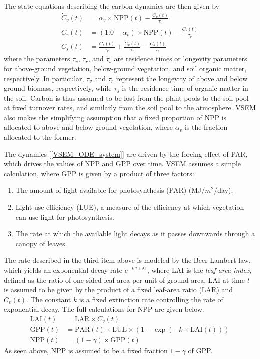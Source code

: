 \documentclass[12pt]{article}
\begin{document}
The state equations describing the carbon dynamics are then given by
\begin{align}
\dot{C}_v(t) &= \alpha_v \times \text{NPP}(t) - \frac{C_v(t)}{\tau_v} \label{VSEM_ODE_system} \\
\dot{C}_r(t) &= (1.0 - \alpha_v) \times \text{NPP}(t) - \frac{C_r(t)}{\tau_r} \nonumber \\
\dot{C}_s(t) &= \frac{C_r(t)}{\tau_r} + \frac{C_v(t)}{\tau_v} - \frac{C_s(t)}{\tau_s} \nonumber 
\end{align}
where the parameters $\tau_v$, $\tau_r$, and $\tau_s$ are residence times or longevity parameters for above-ground vegetation, below-ground vegetation, and soil organic matter, 
respectively. In particular, $\tau_v$ and $\tau_r$ represent the longevity of above and below ground biomass, respectively, while $\tau_s$ is the residence time of organic matter 
in the soil. Carbon is thus assumed to be lost from the plant pools to the soil pool at fixed turnover rates, and similarly from the soil pool to the atmosphere. VSEM also makes the simplifying assumption that a fixed proportion of NPP is allocated to above and below ground vegetation, where $\alpha_v$ is the fraction
allocated to the former. 

The dynamics [\ref{VSEM_ODE_system}] are driven by the forcing effect of PAR, which drives the values of NPP and GPP over time. VSEM assumes a simple calculation, 
where GPP is given by a product of three factors:
\begin{enumerate}
\item The amount of light available for photosynthesis (PAR) (MJ/$m^2$/day).
\item Light-use efficiency (LUE), a measure of the efficiency at which vegetation can use light for photosynthesis. 
\item The rate at which the available light decays as it passes downwards through a canopy of leaves. 
\end{enumerate}
The rate described in the third item above is modeled by the Beer-Lambert law, which yields an exponential decay rate $e^{-k*\text{LAI}}$, 
where LAI is the \textit{leaf-area index}, defined as the ratio of one-sided leaf area per unit of ground area. LAI at time $t$ is assumed to be given by the product of a fixed 
leaf-area ratio (LAR) and $C_v(t)$. The constant $k$ is a fixed extinction rate controlling the rate of exponential decay. The full calculations for NPP are given below. 
\begin{align}
\text{LAI}(t) &= \text{LAR} \times C_v(t) \\
\text{GPP}(t) &= \text{PAR}(t) \times \text{LUE} \times \left(1 -  \exp\left(-k \times \text{LAI}(t) \right) \right) \nonumber \\
\text{NPP}(t) &= (1 - \gamma) \times \text{GPP}(t) \nonumber
\end{align}
As seen above, NPP is assumed to be a fixed fraction $1 - \gamma$ of GPP.
\end{document}
